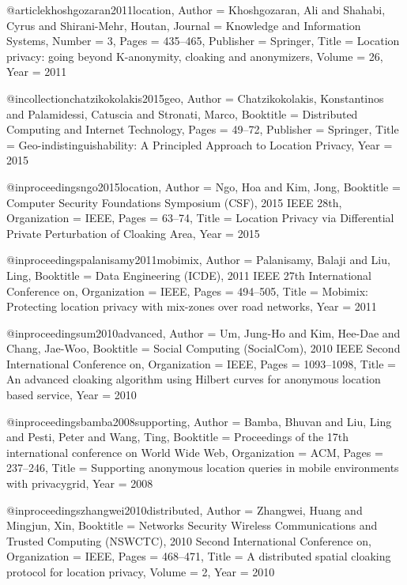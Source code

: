 {{{{{{{	@article{khoshgozaran2011location,
	Author = {Khoshgozaran, Ali and Shahabi, Cyrus and Shirani-Mehr, Houtan},
	Journal = {Knowledge and Information Systems},
	Number = {3},
	Pages = {435--465},
	Publisher = {Springer},
	Title = {Location privacy: going beyond K-anonymity, cloaking and anonymizers},
	Volume = {26},
	Year = {2011}}
	
	@incollection{chatzikokolakis2015geo,
	Author = {Chatzikokolakis, Konstantinos and Palamidessi, Catuscia and Stronati, Marco},
	Booktitle = {Distributed Computing and Internet Technology},
	Pages = {49--72},
	Publisher = {Springer},
	Title = {Geo-indistinguishability: A Principled Approach to Location Privacy},
	Year = {2015}}
	
	@inproceedings{ngo2015location,
	Author = {Ngo, Hoa and Kim, Jong},
	Booktitle = {Computer Security Foundations Symposium (CSF), 2015 IEEE 28th},
	Organization = {IEEE},
	Pages = {63--74},
	Title = {Location Privacy via Differential Private Perturbation of Cloaking Area},
	Year = {2015}}
	
	@inproceedings{palanisamy2011mobimix,
	Author = {Palanisamy, Balaji and Liu, Ling},
	Booktitle = {Data Engineering (ICDE), 2011 IEEE 27th International Conference on},
	Organization = {IEEE},
	Pages = {494--505},
	Title = {Mobimix: Protecting location privacy with mix-zones over road networks},
	Year = {2011}}
	
	@inproceedings{um2010advanced,
	Author = {Um, Jung-Ho and Kim, Hee-Dae and Chang, Jae-Woo},
	Booktitle = {Social Computing (SocialCom), 2010 IEEE Second International Conference on},
	Organization = {IEEE},
	Pages = {1093--1098},
	Title = {An advanced cloaking algorithm using Hilbert curves for anonymous location based service},
	Year = {2010}}
	
	@inproceedings{bamba2008supporting,
	Author = {Bamba, Bhuvan and Liu, Ling and Pesti, Peter and Wang, Ting},
	Booktitle = {Proceedings of the 17th international conference on World Wide Web},
	Organization = {ACM},
	Pages = {237--246},
	Title = {Supporting anonymous location queries in mobile environments with privacygrid},
	Year = {2008}}
	
	@inproceedings{zhangwei2010distributed,
	Author = {Zhangwei, Huang and Mingjun, Xin},
	Booktitle = {Networks Security Wireless Communications and Trusted Computing (NSWCTC), 2010 Second International Conference on},
	Organization = {IEEE},
	Pages = {468--471},
	Title = {A distributed spatial cloaking protocol for location privacy},
	Volume = {2},
	Year = {2010}}
	
}}}}}}}
